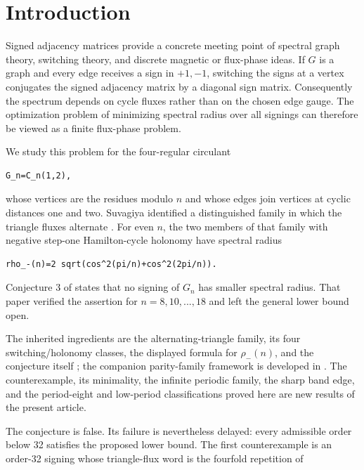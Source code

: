 \section{Introduction}

Signed adjacency matrices provide a concrete meeting point of spectral graph
theory, switching theory, and discrete magnetic or flux-phase ideas. If \(G\) is
a graph and every edge receives a sign in \({+1,-1}\), switching the signs at a
vertex conjugates the signed adjacency matrix by a diagonal sign matrix.
Consequently the spectrum depends on cycle fluxes rather than on the chosen
edge gauge. The optimization problem of minimizing spectral radius over all
signings can therefore be viewed as a finite flux-phase problem.

We study this problem for the four-regular circulant

\begin{lstlisting}[language={}]
G_n=C_n(1,2),
\end{lstlisting}

whose vertices are the residues modulo \(n\) and whose edges join vertices at
cyclic distances one and two. Suvagiya identified a distinguished family in
which the triangle fluxes alternate \cite{Suvagiya2026Signed}. For even \(n\), the two members of that
family with negative step-one Hamilton-cycle holonomy have spectral radius

\begin{lstlisting}[language={}]
rho_-(n)=2 sqrt(cos^2(pi/n)+cos^2(2pi/n)).
\end{lstlisting}

Conjecture 3 of \cite{Suvagiya2026Signed} states that no signing of \(G_n\) has smaller spectral
radius. That paper verified the assertion for \(n=8,10,...,18\) and left the
general lower bound open.

The inherited ingredients are the alternating-triangle family, its four
switching/holonomy classes, the displayed formula for \(\rho_-(n)\), and the
conjecture itself \cite{Suvagiya2026Signed}; the companion parity-family framework is developed in
\cite{Suvagiya2026Parity}. The counterexample, its minimality, the infinite periodic family, the
sharp band edge, and the period-eight and low-period classifications proved
here are new results of the present article.

The conjecture is false. Its failure is nevertheless delayed: every admissible
order below 32 satisfies the proposed lower bound. The first counterexample is
an order-32 signing whose triangle-flux word is the fourfold repetition of

